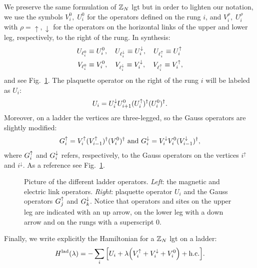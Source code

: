 We preserve the same formulation of $\Z_N$ \ac{lgt} but in order to lighten our notation,
we use the symbols $V^0_i, \; U^0_i$ for the operators defined on the rung $i$, and  $V^{\rho}_i, \; U^{\rho}_i$ with $\rho = \uparrow, \downarrow$ for the operators on the horizontal links of the upper and lower leg, respectively, to the right of the rung.
In synthesis:
\begin{equation}
    \begin{split}
        U_{\ell^0_i} & \equiv U^0_i, \quad
        U_{\ell^\downarrow_i}   \equiv U^{\downarrow}_i, \quad
        U_{\ell^\uparrow_i}   \equiv U^{\uparrow}_i \\
        V_{\ell^0_i} & \equiv V^0_i, \quad
        V_{\ell^\downarrow_i}   \equiv V^{\downarrow}_i, \quad
        V_{\ell^\uparrow_i}   \equiv V^{\uparrow}_i,
    \end{split}
\end{equation}
and see Fig.~\ref{fig:ladder_operators}.
The plaquette operator on the right of the rung $i$ will be labeled as $U_i$:
\begin{equation}
    U_i = U^{\downarrow}_i U^0_{i+1} (U^{\uparrow}_i)^{\dagger} (U^0_i)^{\dagger}.
    \label{eq:plaq_op_ladder}
\end{equation}
Moreover, on a ladder the vertices are three-legged, so the Gauss operators are slightly modified:
\begin{equation}
    G^{\uparrow}_i
    = V^{\uparrow}_i ( V^{\uparrow}_{i-1} )^\dagger ( V^0_i )^\dagger \text{~and~}
    G^{\downarrow}_i
    = V^{\downarrow}_i V^0_i ( V^{\downarrow}_{i-1} )^\dagger,
    \label{eq:gauss_law_ladder}
\end{equation}
where $G^{\uparrow}_i$ and $G^{\downarrow}_i$ refers, respectively, to the Gauss operators on the vertices $i^{\uparrow}$ and $i^{\downarrow}$.
As a reference see Fig.~\ref{fig:ladder_operators}.

\begin{figure}
    \centering
    
    \caption[Operators of a $\Z_N$ ladder \ac{lgt}]{%
        Picture of the different ladder operators.
        \emph{Left}: the magnetic and electric link operators.
        \emph{Right}: plaquette operator $U_i$ and the Gauss operators $G^{\uparrow}_j$ and $G^{\downarrow}_k$.
        Notice that operators and sites on the upper leg are indicated with an up arrow, on the lower leg with a down arrow and on the rungs with a superscript $0$.
    }
    \label{fig:ladder_operators}
\end{figure}


Finally, we write explicitly the Hamiltonian for a $\Z_N$ \ac{lgt} on a ladder:
\begin{equation}
    \Hladder(\lambda) =
    - \sum_{i} \bqty{ U_i + \lambda \pqty{ \Vup_i + \Vdown_i + V^0_i } + \text{h.c.} }.
    \label{eq:ladder_hamiltonian}
\end{equation}


